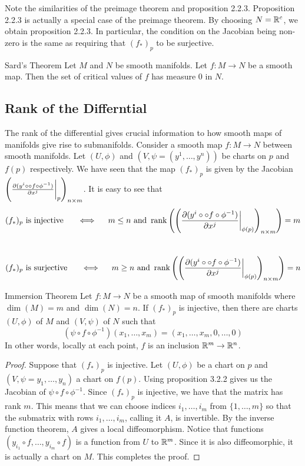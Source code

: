 \documentclass[a4paper]{article}
\begin{document}
Note the similarities of the preimage theorem and proposition 2.2.3. Proposition 2.2.3 is actually a special case of the preimage theorem. By choosing $N=\mathbb{R}^c$, we obtain proposition 2.2.3. In particular, the condition on the Jacobian being non-zero is the same as requiring that $(f_\ast)_p$ to be surjective. 

\begin{thm}{Sard's Theorem}{} Let $M$ and $N$ be smooth manifolds. Let $f:M\to N$ be a smooth map. Then the set of critical values of $f$ has measure $0$ in $N$. 
\end{thm}

\subsection{Rank of the Differntial}
The rank of the differential gives crucial information to how smooth maps of manifolds give rise to submanifolds. Consider a smooth map $f:M\to N$ between smooth manifolds. Let $(U,\phi)$ and $(V,\psi=(y^1,\dots,y^n))$ be charts on $p$ and $f(p)$ respectively. We have seen that the map $(f_\ast)_p$ is given by the Jacobian $\left(\frac{\partial(y^i\circ\circ f\circ\phi^{-1})}{\partial x^j}\bigg{|}_p\right)_{n\times m}$. It is easy to see that $$(f_\ast)_p\text{ is injective }\;\;\;\;\iff\;\;\;\;m\leq n\text{ and }\rank\left(\left(\frac{\partial(y^i\circ\circ f\circ\phi^{-1})}{\partial x^j}\bigg{|}_{\phi(p)}\right)_{n\times m}\right)=m$$~$$(f_\ast)_p\text{ is surjective }\;\;\;\;\iff\;\;\;\;m\geq n\text{ and }\rank\left(\left(\frac{\partial(y^i\circ\circ f\circ\phi^{-1})}{\partial x^j}\bigg{|}_{\phi(p)}\right)_{n\times m}\right)=n$$ 

\begin{thm}{Immersion Theorem}{} Let $f:M\to N$ be a smooth map of smooth manifolds where $\dim(M)=m$ and $\dim(N)=n$. If $(f_\ast)_p$ is injective, then there are charts $(U,\phi)$ of $M$ and $(V,\psi)$ of $N$ such that $$(\psi\circ f\circ\phi^{-1})(x_1,\dots,x_m)=(x_1,\dots,x_m,0,\dots,0)$$ In other words, locally at each point, $f$ is an inclusion $\mathbb{R}^m\to\mathbb{R}^n$. \tcbline
\begin{proof}
Suppose that $(f_\ast)_p$ is injective. Let $(U,\phi)$ be a chart on $p$ and $(V,\psi=y_1,\dots,y_n)$ a chart on $f(p)$. Using proposition 3.2.2 gives us the Jacobian of $\psi\circ f\circ\phi^{-1}$. Since $(f_\ast)_p$ is injective, we have that the matrix has rank $m$. This means that we can choose indices $i_1,\dots,i_m$ from $\{1,\dots,m\}$ so that the submatrix with rows $i_1,\dots,i_m$, calling it $A$, is invertible. By the inverse function theorem, $A$ gives a local diffeomorphism. Notice that functions $(y_{i_1}\circ f,\dots,y_{i_m}\circ f)$ is a function from $U$ to $\mathbb{R}^m$. Since it is also diffeomorphic, it is actually a chart on $M$. This completes the proof. 
\end{proof}
\end{thm}
\end{document}
